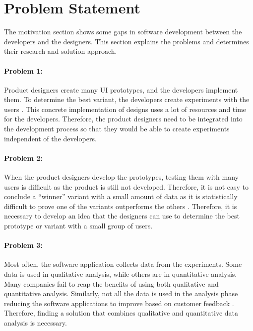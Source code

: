\section{Problem Statement} %
\label{introduction:section:problems}
The motivation section shows some gaps in software development between the developers and the designers.
This section explains the problems and determines their research and solution approach.

\paragraph{Problem 1:} Product designers create many UI prototypes, and the developers implement them.
To determine the best variant, the developers create experiments with the users \cite{article:experiments:lindgren}. 
This concrete implementation of designs uses a lot of resources and time for the developers.
Therefore, the product designers need to be integrated into the development process so that they would be able to create experiments independent of the developers.

\paragraph{Problem 2:} When the product designers develop the prototypes, testing them with many users is difficult as the product is still not developed.
Therefore, it is not easy to conclude a ``winner'' variant with a small amount of data as it is statistically difficult to prove one of the variants outperforms the others \cite{article:usability:smalldata}.
Therefore, it is necessary to develop an idea that the designers can use to determine the best prototype or variant with a small group of users.

\paragraph{Problem 3:} Most often, the software application collects data from the experiments. 
Some data is used in qualitative analysis, while others are in quantitative analysis.
Many companies fail to reap the benefits of using both qualitative and quantitative analysis.
Similarly, not all the data is used in the analysis phase reducing the software applications to improve based on customer feedback \cite{article:datadrive:brian}.
Therefore, finding a solution that combines qualitative and quantitative data analysis is necessary.

